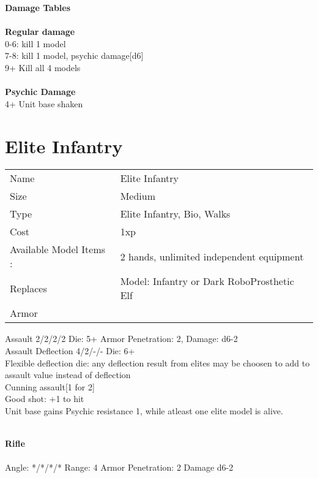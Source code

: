 {\bf Damage Tables} \\
\ \\ {\bf Regular damage } \\
0-6: kill 1 model \\
7-8: kill 1 model, psychic damage[d6] \\
9+ Kill all 4 models \\
\ \\ {\bf Psychic Damage } \\
4+ Unit base shaken \\









\pagebreak

\section{ Elite Infantry }

\begin{tabular}{ll}
  Name & Elite Infantry \\
  Size & Medium\\
  Type & Elite Infantry, Bio, Walks\\
  Cost & 1xp\\
  Available Model Items : &2 hands, unlimited independent equipment\\
  Replaces & Model: Infantry or Dark RoboProsthetic Elf\\
  Armor & 
\end{tabular}



Assault 2/2/2/2 Die: 5+ Armor Penetration: 2, Damage: d6-2 \\
Assault Deflection 4/2/-/- Die: 6+\\
Flexible deflection die: any deflection result from elites may be choosen to add to assault value instead of deflection\\ Cunning assault[1 for 2]
\ \\

Good shot: +1 to hit \\ Unit base gains Psychic resistance 1, while atleast one elite model is alive.

\ \\
{\bf Rifle } \\
\ \\
Angle: */*/*/* Range: 4 Armor Penetration: 2 Damage d6-2 \\
\indent  \\






